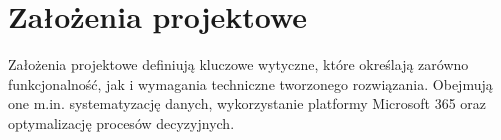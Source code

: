 \section{Założenia projektowe}
Założenia projektowe definiują kluczowe wytyczne, które określają zarówno funkcjonalność, jak i wymagania techniczne tworzonego rozwiązania. Obejmują one m.in. systematyzację danych, wykorzystanie platformy Microsoft 365 oraz optymalizację procesów decyzyjnych.




